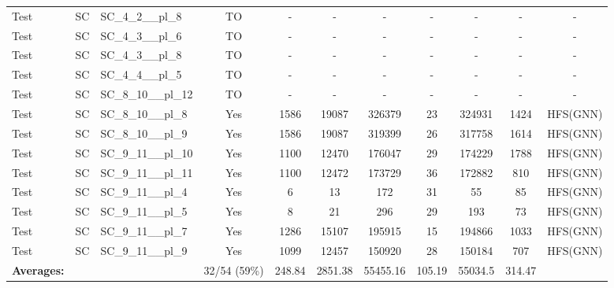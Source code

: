 \documentclass{article}
\begin{document}
\begin{tabular}{lllcccccccc}
Test & SC & SC\_4\_2\_\_pl\_8 & TO & - & - & - & - & - & - & - \\
Test & SC & SC\_4\_3\_\_pl\_6 & TO & - & - & - & - & - & - & - \\
Test & SC & SC\_4\_3\_\_pl\_8 & TO & - & - & - & - & - & - & - \\
Test & SC & SC\_4\_4\_\_pl\_5 & TO & - & - & - & - & - & - & - \\
Test & SC & SC\_8\_10\_\_pl\_12 & TO & - & - & - & - & - & - & - \\
Test & SC & SC\_8\_10\_\_pl\_8 & Yes & 1586 & 19087 & 326379 & 23 & 324931 & 1424 & HFS(GNN) \\
Test & SC & SC\_8\_10\_\_pl\_9 & Yes & 1586 & 19087 & 319399 & 26 & 317758 & 1614 & HFS(GNN) \\
Test & SC & SC\_9\_11\_\_pl\_10 & Yes & 1100 & 12470 & 176047 & 29 & 174229 & 1788 & HFS(GNN) \\
Test & SC & SC\_9\_11\_\_pl\_11 & Yes & 1100 & 12472 & 173729 & 36 & 172882 & 810 & HFS(GNN) \\
Test & SC & SC\_9\_11\_\_pl\_4 & Yes & 6 & 13 & 172 & 31 & 55 & 85 & HFS(GNN) \\
Test & SC & SC\_9\_11\_\_pl\_5 & Yes & 8 & 21 & 296 & 29 & 193 & 73 & HFS(GNN) \\
Test & SC & SC\_9\_11\_\_pl\_7 & Yes & 1286 & 15107 & 195915 & 15 & 194866 & 1033 & HFS(GNN) \\
Test & SC & SC\_9\_11\_\_pl\_9 & Yes & 1099 & 12457 & 150920 & 28 & 150184 & 707 & HFS(GNN) \\
\textbf{Averages:} & & & 32/54 (59\%) & 248.84 & 2851.38 & 55455.16 & 105.19 & 55034.5 & 314.47 & \\
\bottomrule
\end{tabular}
\newpage
\end{document}
